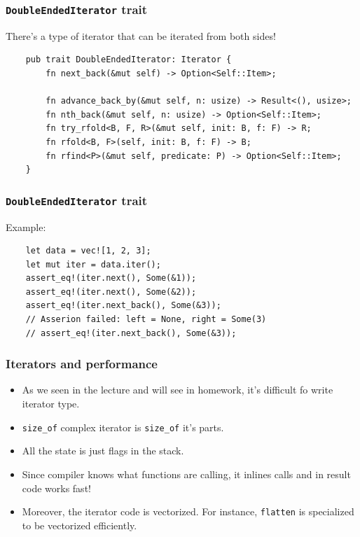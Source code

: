 \documentclass[aspectratio=1610,t]{beamer}
\begin{document}

\begin{frame}[fragile]
\frametitle{\texttt{DoubleEndedIterator} trait}
There's a type of iterator that can be iterated from both sides!

\begin{verbatim}
    pub trait DoubleEndedIterator: Iterator {
        fn next_back(&mut self) -> Option<Self::Item>;

        fn advance_back_by(&mut self, n: usize) -> Result<(), usize>;
        fn nth_back(&mut self, n: usize) -> Option<Self::Item>;
        fn try_rfold<B, F, R>(&mut self, init: B, f: F) -> R;
        fn rfold<B, F>(self, init: B, f: F) -> B;
        fn rfind<P>(&mut self, predicate: P) -> Option<Self::Item>;
    }
\end{verbatim}
\end{frame}


\begin{frame}[fragile]
\frametitle{\texttt{DoubleEndedIterator} trait}
Example:

\begin{verbatim}
    let data = vec![1, 2, 3];
    let mut iter = data.iter();
    assert_eq!(iter.next(), Some(&1));
    assert_eq!(iter.next(), Some(&2));
    assert_eq!(iter.next_back(), Some(&3));
    // Asserion failed: left = None, right = Some(3)
    // assert_eq!(iter.next_back(), Some(&3));
\end{verbatim}
\end{frame}


\begin{frame}[fragile]
\frametitle{Iterators and performance}
\begin{itemize}
    \item As we seen in the lecture and will see in homework, it's difficult fo write iterator type.
    \item \texttt{size\_of} complex iterator is \texttt{size\_of} it's parts.
    \item All the state is just flags in the stack.
    \item Since compiler knows what functions are calling, it inlines calls and in result code works fast!
    \item Moreover, the iterator code is vectorized. For instance, \texttt{flatten} is specialized to be vectorized efficiently.
\end{itemize}
\end{frame}
\end{document}
